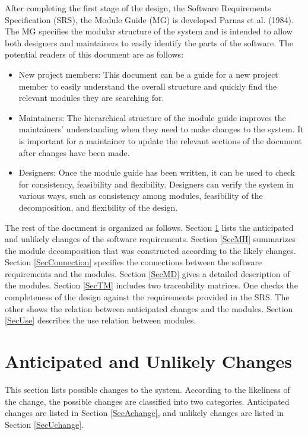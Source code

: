 \documentclass[12pt, titlepage]{article}
\begin{document}
After completing the first stage of the design, the Software Requirements
Specification (SRS), the Module Guide (MG) is developed Parnas et al. (1984). The MG
specifies the modular structure of the system and is intended to allow both
designers and maintainers to easily identify the parts of the software.  The
potential readers of this document are as follows:

\begin{itemize}
\item New project members: This document can be a guide for a new project member
  to easily understand the overall structure and quickly find the
  relevant modules they are searching for.
\item Maintainers: The hierarchical structure of the module guide improves the
  maintainers' understanding when they need to make changes to the system. It is
  important for a maintainer to update the relevant sections of the document
  after changes have been made.
\item Designers: Once the module guide has been written, it can be used to
  check for consistency, feasibility and flexibility. Designers can verify the
  system in various ways, such as consistency among modules, feasibility of the
  decomposition, and flexibility of the design.
\end{itemize}

The rest of the document is organized as follows. Section
\ref{SecChange} lists the anticipated and unlikely changes of the software
requirements. Section \ref{SecMH} summarizes the module decomposition that
was constructed according to the likely changes. Section \ref{SecConnection}
specifies the connections between the software requirements and the
modules. Section \ref{SecMD} gives a detailed description of the
modules. Section \ref{SecTM} includes two traceability matrices. One checks
the completeness of the design against the requirements provided in the SRS. The
other shows the relation between anticipated changes and the modules. Section
\ref{SecUse} describes the use relation between modules.

\section{Anticipated and Unlikely Changes} \label{SecChange}

This section lists possible changes to the system. According to the likeliness
of the change, the possible changes are classified into two
categories. Anticipated changes are listed in Section \ref{SecAchange}, and
unlikely changes are listed in Section \ref{SecUchange}.
\end{document}
